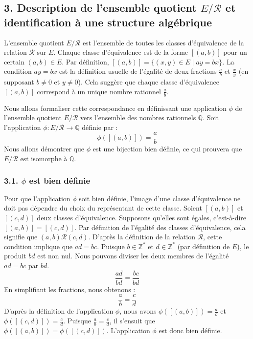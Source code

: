 \documentclass{report}
\begin{document}
\subsection*{3. Description de l'ensemble quotient $E/\mathcal{R}$ et identification à une structure algébrique}

L'ensemble quotient $E/\mathcal{R}$ est l'ensemble de toutes les classes d'équivalence de la relation $\mathcal{R}$ sur $E$. Chaque classe d'équivalence est de la forme $[(a,b)]$ pour un certain $(a,b) \in E$.
Par définition, $[(a,b)] = \{ (x,y) \in E \mid ay = bx \}$.
La condition $ay=bx$ est la définition usuelle de l'égalité de deux fractions $\frac{a}{b}$ et $\frac{x}{y}$ (en supposant $b \neq 0$ et $y \neq 0$).
Cela suggère que chaque classe d'équivalence $[(a,b)]$ correspond à un unique nombre rationnel $\frac{a}{b}$.

Nous allons formaliser cette correspondance en définissant une application $\phi$ de l'ensemble quotient $E/\mathcal{R}$ vers l'ensemble des nombres rationnels $\mathbb{Q}$.
Soit l'application $\phi: E/\mathcal{R} \to \mathbb{Q}$ définie par :
$$ \phi([(a,b)]) = \frac{a}{b} $$
Nous allons démontrer que $\phi$ est une bijection bien définie, ce qui prouvera que $E/\mathcal{R}$ est isomorphe à $\mathbb{Q}$.

\subsubsection*{3.1. $\phi$ est bien définie}
Pour que l'application $\phi$ soit bien définie, l'image d'une classe d'équivalence ne doit pas dépendre du choix du représentant de cette classe.
Soient $[(a,b)]$ et $[(c,d)]$ deux classes d'équivalence. Supposons qu'elles sont égales, c'est-à-dire $[(a,b)] = [(c,d)]$.
Par définition de l'égalité des classes d'équivalence, cela signifie que $(a,b) \mathcal{R} (c,d)$.
D'après la définition de la relation $\mathcal{R}$, cette condition implique que $ad = bc$.
Puisque $b \in \mathbb{Z}^*$ et $d \in \mathbb{Z}^*$ (par définition de $E$), le produit $bd$ est non nul. Nous pouvons diviser les deux membres de l'égalité $ad = bc$ par $bd$.
$$ \frac{ad}{bd} = \frac{bc}{bd} $$
En simplifiant les fractions, nous obtenons :
$$ \frac{a}{b} = \frac{c}{d} $$
D'après la définition de l'application $\phi$, nous avons $\phi([(a,b)]) = \frac{a}{b}$ et $\phi([(c,d)]) = \frac{c}{d}$.
Puisque $\frac{a}{b} = \frac{c}{d}$, il s'ensuit que $\phi([(a,b)]) = \phi([(c,d)])$.
L'application $\phi$ est donc bien définie.
\end{document}
